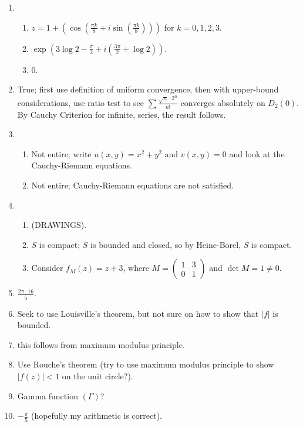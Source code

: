 \documentclass[12pt]{article}
\theoremstyle{definition}
\theoremstyle{named}
\begin{document}
\begin{enumerate}
    \item
    \begin{enumerate}
        \item $z=1 + \left(\cos\left(\frac{\pi k}{8} + i\sin\left(\frac{\pi k}{8}\right)\right)\right)$ for $k=0,1,2,3$. 
        \item $\exp(3\log 2 - \frac{\pi}{2} + i(\frac{3\pi}{2} + \log 2))$. 
        \item 0. 
    \end{enumerate}
    \item True; first use definition of uniform convergence, then with upper-bound considerations, use ratio test to see $\sum \frac{\sqrt{n} \cdot 2^n}{n!}$ converges absolutely on $\overline{D_2(0)}$. By Cauchy Criterion for infinite, series, the result follows. 
    \item 
    \begin{enumerate}
        \item Not entire; write $u(x,y) = x^2 + y^2$ and $v(x,y) = 0$ and look at the Cauchy-Riemann equations. 
        \item Not entire; Cauchy-Riemann equations are not satisfied. 
    \end{enumerate}
    \item
    \begin{enumerate}
        \item (DRAWINGS). 
        \item $S$ is compact; $S$ is bounded and closed, so by Heine-Borel, $S$ is compact. 
        \item Consider $f_M(z) = z + 3$, where $M = \begin{pmatrix}
            1 & 3 \\
            0 & 1
        \end{pmatrix}$ and $\det M = 1 \neq 0$. 
    \end{enumerate}
    \item $\frac{2\pi \cdot 16}{5}$. 
    \item Seek to use Louisville's theorem, but not sure on how to show that $|f|$ is bounded. 
    \item this follows from maximum modulus principle. 
    \item Use Rouche's theorem (try to use maximum modulus principle to show $|f(z)| < 1$ on the unit circle?). 
    \item Gamma function $(\Gamma)$? 
    \item $-\frac{\pi}{5}$ (hopefully my arithmetic is correct). 
\end{enumerate}
\end{document}
